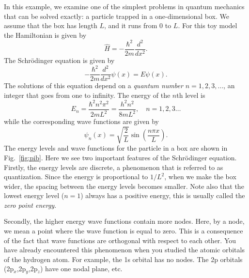 \documentclass[../Main/notes.tex]{subfiles}
\begin{document}

\begin{example}

In this example, we examine one of the simplest problems in quantum mechanics that can be solved exactly: a particle trapped in a one-dimensional box.
We assume that the box has length $L$, and it runs from 0 to $L$.
For this toy model the Hamiltonian is given by
\begin{equation}
\hat{H} = -\frac{\hbar^2}{2m} \frac{d^2}{dx^2}.
\end{equation}
The Schr\"{o}dinger equation is given by
\begin{equation}
-\frac{\hbar^2}{2m} \frac{d^2}{dx^2} \psi(x) = E \psi(x).
\end{equation}
The solutions of this equation depend on a \emph{quantum number} $n = 1, 2, 3, \ldots$, an integer that goes from one to infinity.
The energy of the $n$th level is
\begin{equation}
E_n = \frac{\hbar^2 n^2 \pi^2}{2m L^2} = \frac{h^2 n^2 }{8 m L^2}, \quad n = 1,2,3\ldots
\end{equation}
while the corresponding wave functions are given by
\begin{equation}
\psi_{n}(x) = \sqrt{\frac{2}{L}} \sin\left(\frac{n \pi x}{L}\right).
\end{equation}
The energy levels and wave functions for the particle in a box are shown in Fig.~\ref{fig:pib}.
Here we see two important features of the Schr\"{o}dinger equation.
Firstly, the energy levels are discrete, a phenomenon that is referred to as quantization.
Since the energy is proportional to $1/L^2$, when we make the box wider, the spacing between the energy levels becomes smaller.
Note also that the lowest energy level ($n=1$) always has a positive energy, this is usually called the \emph{zero point energy}.

Secondly, the higher energy wave functions contain more nodes.
Here, by a node, we mean a point where the wave function is equal to zero.
This is a consequence of the fact that wave functions are orthogonal with respect to each other.
You have already encountered this phenomenon when you studied the atomic orbitals of the hydrogen atom.
For example, the 1s orbital has no nodes. The 2p orbitals (2p$_x$,2p$_y$,2p$_z$) have one nodal plane, etc.
\end{example}
\end{document}
